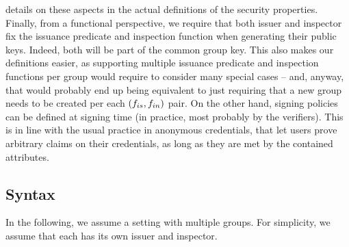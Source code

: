 details on these aspects in the actual definitions of the security properties.
%
Finally, from a functional perspective, we require that both issuer and
inspector fix the issuance predicate \fissue and inspection function \finsp when
generating their public keys. Indeed, both will be part of the common group key.
This also makes our definitions easier, as supporting multiple issuance
predicate and inspection functions per group would require to consider many
special cases -- and, anyway, that would probably end up being equivalent to
just requiring that a new group needs to be created per each $(f_{is},f_{in})$
pair. On the other hand, signing policies can be defined at signing time (in
practice, most probably by the verifiers). This is in line with the usual
practice in anonymous credentials, that let users prove arbitrary claims on
their credentials, as long as they are met by the contained attributes.

\subsection{Syntax}
\label{ssec:syntax}

In the following, we assume a setting with multiple groups. For simplicity,
we assume that each has its own issuer and inspector.



